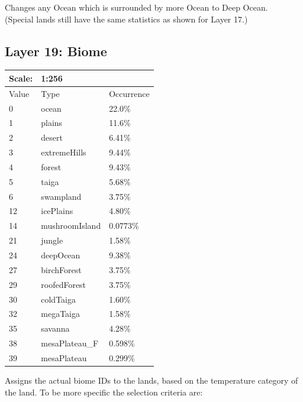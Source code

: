 \documentclass{article}
\begin{document}
	\medskip\noindent
	Changes any Ocean which is surrounded by more Ocean to Deep Ocean.\\
	(Special lands still have the same statistics as shown for Layer 17.)


	\subsection{Layer 19: Biome}
	\begin{tabular}{|l|l|l|}\hline
		Scale: & \multicolumn{2}{|l|}{1:256} \\\hline\hline
		Value  & Type           & Occurrence \\\hline
		0      & ocean          & 22.0\%\\\hline
		1      & plains         & 11.6\%\\\hline
		2      & desert         & 6.41\%\\\hline
		3      & extremeHills   & 9.44\%\\\hline
		4      & forest         & 9.43\%\\\hline
		5      & taiga          & 5.68\%\\\hline
		6      & swampland      & 3.75\%\\\hline
		12     & icePlains      & 4.80\%\\\hline
		14     & mushroomIsland & 0.0773\%\\\hline
		21     & jungle         & 1.58\%\\\hline
		24     & deepOcean      & 9.38\%\\\hline
		27     & birchForest    & 3.75\%\\\hline
		29     & roofedForest   & 3.75\%\\\hline
		30     & coldTaiga      & 1.60\%\\\hline
		32     & megaTaiga      & 1.58\%\\\hline
		35     & savanna        & 4.28\%\\\hline
		38     & mesaPlateau\_F & 0.598\%\\\hline
		39     & mesaPlateau    & 0.299\%\\\hline
	\end{tabular}

	\medskip\noindent
	Assigns the actual biome IDs to the lands, based on the temperature category of the land. To be more specific the selection criteria are:
\end{document}
